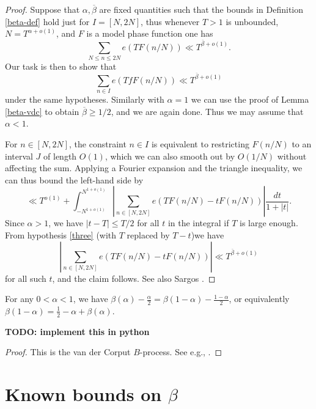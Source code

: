 \begin{proof}  Suppose that $\alpha, \overline{\beta}$ are fixed quantities such that the bounds in Definition \ref{beta-def} hold just for $I  = [N,2N]$, thus whenever $T>1$ is unbounded, $N = T^{\alpha+o(1)}$, and $F$ is a model phase function one has
\begin{equation}\label{three}
     \sum_{N \leq n \leq 2N} e(T F(n/N)) \ll T^{\overline{\beta}+o(1)}.
\end{equation}
Our task is then to show that
$$ \sum_{n \in I} e(T fF(n/N)) \ll T^{\overline{\beta}+o(1)}$$
under the same hypotheses. Similarly with $\alpha=1$ we can use the proof of Lemma \ref{beta-vdc} to obtain $\overline{\beta} \geq 1/2$, and we are again done.  Thus we may assume that $\alpha < 1$.

    For $n \in [N,2N]$, the constraint $n \in I$ is equivalent to restricting $F(n/N)$ to an interval $J$ of length $O(1)$, which we can also smooth out by $O(1/N)$ without affecting the sum.  Applying a Fourier expansion and the triangle inequality, we can thus bound the left-hand side by
$$ \ll T^{o(1)} + \int_{-N^{1+o(1)}}^{N^{1+o(1)}} \left|\sum_{n \in [N,2N]} e(T F(n/N) - t F(n/N)) \right| \frac{dt}{1+|t|}.$$
Since $\alpha > 1$, we have $|t-T| \leq T/2$ for all $t$ in the integral if $T$ is large enough.
From hypothesis \eqref{three} (with $T$ replaced by $T-t$)we have
$$ \left|\sum_{n \in [N,2N]} e(T F(n/N) - t F(n/N)) \right| \ll T^{\overline{\beta}+o(1)}$$
for all such $t$, and the claim follows. See also Sargos \cite[p 310]{sargos_points_1995}.
\end{proof}

\begin{lemma}[Reflection]\label{beta-reflect}  For any $0 < \alpha < 1$, we have $\beta(\alpha) - \frac{\alpha}{2} = \beta(1-\alpha) - \frac{1-\alpha}{2}$, or equivalently $\beta(1-\alpha) = \frac{1}{2} - \alpha + \beta(\alpha)$.
\end{lemma}

{\bf TODO: implement this in python}

\begin{proof}  This is the van der Corput $B$-process. See e.g., \cite[p 370]{huxley_area_1996}.
\end{proof}

\section{Known bounds on \texorpdfstring{$\beta$}{beta}}


